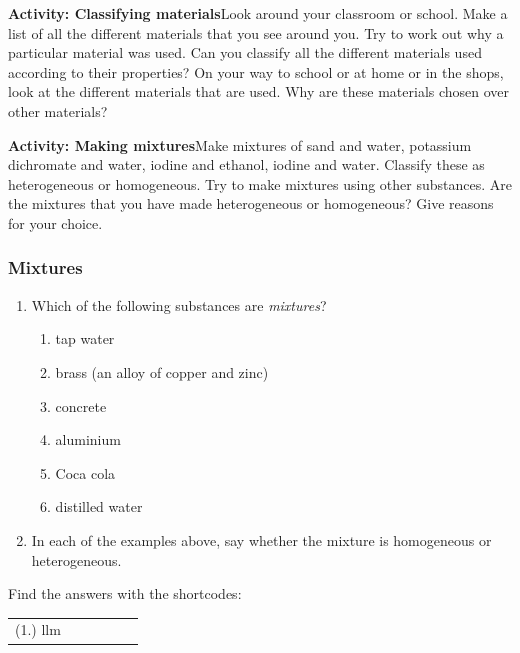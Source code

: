  \label{m38708*eip-478}\noindent{}\textbf{Activity: Classifying materials}Look around your classroom or school. Make a list of all the different materials that you see around you. Try to work out why a particular material was used. Can you classify all the different materials used according to their properties? On your way to school or at home or in the shops, look at the different materials that are used. Why are these materials chosen over other materials?\par \label{m38708*eip-894}\noindent{}\textbf{Activity: Making mixtures}Make mixtures of sand and water, potassium dichromate and water, iodine and ethanol, iodine and water. Classify these as heterogeneous or homogeneous. Try to make mixtures using other substances. Are the mixtures that you have made heterogeneous or homogeneous? Give reasons for your choice. \par \label{m38708*secfhsst!!!underscore!!!id169}
            \subsubsection{ Mixtures         }
            \nopagebreak
            \label{m38708*id63150}\begin{enumerate}[noitemsep, label=\textbf{\arabic*}. ] 
            \label{m38708*uid17}\item Which of the following substances are \textsl{mixtures}?
\label{m38708*id63170}\begin{enumerate}[noitemsep, label=\textbf{\alph*}. ] 
            \label{m38708*uid18}\item tap water
\label{m38708*uid19}\item brass (an alloy of copper and zinc)
\label{m38708*uid20}\item concrete
\label{m38708*uid21}\item aluminium
\label{m38708*uid22}\item Coca cola
\label{m38708*uid23}\item distilled water
\end{enumerate}
        \label{m38708*uid24}\item In each of the examples above, say whether the mixture is homogeneous or heterogeneous.\newline
     \end{enumerate}
    \label{m38708*cid3}
\par {} Find the answers with the shortcodes:
 \par \begin{tabular}[h]{cccccc}
 (1.) llm  & \end{tabular}
